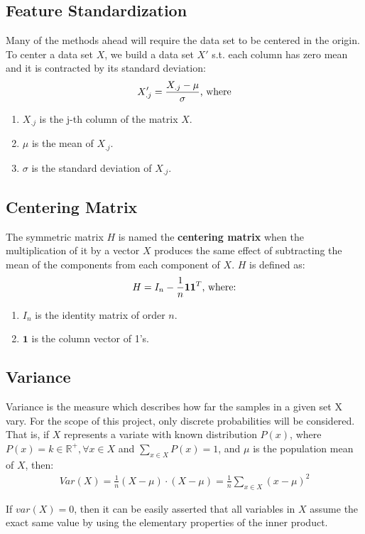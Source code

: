 \subsection{Feature Standardization}
Many of the methods ahead will require the data set to be centered in the origin. To center a data set $X$, we build a data set $X'$ s.t. each column has zero mean and it is contracted by its standard deviation:
$$X'_{.j} = \frac{X_{.j} - \mu}{\sigma} \textnormal{, where}$$
\begin{enumerate}
	\item $X_{.j}$ is the j-th column of the matrix $X$.
	\item $\mu$ is the mean of $X_{.j}$.
	\item $\sigma$ is the standard deviation of $X_{.j}$.
\end{enumerate}

\subsection{Centering Matrix}
The symmetric matrix $H$ is named the \textbf{centering matrix} when the multiplication of it by a vector $X$ produces the same effect of subtracting the mean of the components from each component of $X$. $H$ is defined as:
$$
H = I_n - \frac{1}{n}\textbf{11}^T \textnormal{, where:}
$$
\begin{enumerate}
	\item $I_n$ is the identity matrix of order $n$.
	\item $\textbf{1}$ is the column vector of 1's.
\end{enumerate}

\subsection{Variance}
Variance is the measure which describes how far the samples in a given set X vary. For the scope of this project, only discrete probabilities will be considered. That is, if $X$ represents a variate with known distribution $P(x)$, where $P(x) = k \in \mathbb{R}^{+}, \forall x \in X$ and $\sum_{x \in X} P(x) = 1$, and $\mu$ is the population mean of $X$, then: \cite{ross2010introductory}
\begin{align*}
	Var(X) = \frac{1}{n} (X-\mu) \cdot (X-\mu) = \frac{1}{n} \sum_{x \in X} (x - \mu)^2
\end{align*}

\begin{remark}
	If $var(X) = 0$, then it can be easily asserted that all variables in $X$ assume the exact same value by using the elementary properties of the inner product.
\end{remark}


